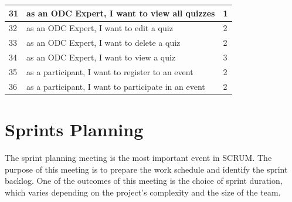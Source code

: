 \begin{longtable}{|l|l|l|}
      31                     & as an ODC Expert, I want to view all quizzes             & 1                 \\ \hline
      32                     & as an ODC Expert, I want to edit a quiz                  & 2                 \\ \hline
      33                     & as an ODC Expert, I want to delete a quiz                & 2                 \\ \hline
      34                     & as an ODC Expert, I want to view a quiz                  & 3                 \\ \hline
      35                     & as a participant, I want to register to an event         & 2                 \\ \hline
      36                     & as a participant, I want to participate in an event      & 2                 \\ \hline
\end{longtable}


\section{Sprints Planning}
The sprint planning meeting is the most important event in SCRUM. The purpose
of this meeting is to prepare the work schedule and identify the sprint
backlog. One of the outcomes of this meeting is the choice of sprint duration,
which varies depending on the project's complexity and the size of the team.


